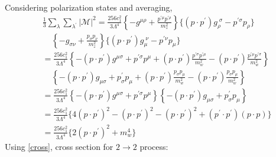 \documentclass[12pt]{report}
\begin{document}
Considering polarization states and averaging,
\begin{align*}
& \frac{1}{3} \sum_\lambda \sum_{\lambda^\prime} |\mathcal{M}|^2  = \frac{256 c^2_1}{3\Lambda^4} \left\{-g^{\mu \rho} + \frac{p^{\prime \mu} p^{\prime \rho}}{m^2_z} \right\}\{(p\cdot p^\prime) g_\rho^{\;\sigma}-p^{\prime \sigma} p_\rho\} \\
&\;\;\;\; \left\{ -g_{\sigma \nu} +\frac{p_\sigma p_\nu}{m^2_z} \right\} \{(p\cdot p^\prime) g^{\;\nu}_\mu -p^{\prime \nu} p_\mu \}\\
& =\frac{256 c^2_1}{3\Lambda^4} \left\{-(p \cdot p^\prime) g^{\mu \sigma} +p^{\prime \sigma} p^{\mu} +(p \cdot p^\prime) \frac{p^{\prime \sigma} p^{\prime \mu}}{m^2_w} -(p\cdot p^\prime) \frac{p^{\prime \mu} p^{\prime \sigma}}{m^2_w} \right\}\\
& \;\;\;\; \left\{-(p \cdot p^\prime) g_{\mu \sigma}+p^\prime_\sigma p_\mu +(p \cdot p^\prime) \frac{p_\sigma p_\mu}{m^2_w} -(p \cdot p^\prime) \frac{p_\sigma p_\mu}{m^2_w}   \right\} \\
&=\frac{256 c^2_1}{3\Lambda^4} \left\{-(p \cdot p^\prime) g^{\mu \sigma} + p^{\prime \sigma} p^\mu \right\} \left\{-(p \cdot p^\prime) g_{\mu \sigma} + p^\prime_\sigma p_\mu \right\}\\
& =\frac{256 c^2_1}{3\Lambda^4}  \{ 4(p \cdot p^\prime)^2 - (p \cdot p^\prime)^2 -(p \cdot p^\prime)^2 + (p^\prime \cdot p^\prime) (p \cdot p)  \} \\
&  =\frac{256 c^2_1}{3\Lambda^4} \{ 2(p \cdot p^\prime)^2 +m_w^4\}
\end{align*}
Using \ref{cross}, cross section for $2 \longrightarrow 2$ process:
\end{document}
